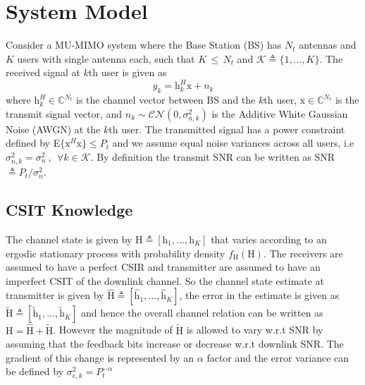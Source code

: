 \documentclass[journal]{IEEEtran}
\begin{document}
\section{System Model} \label{sys_mod}
Consider a MU-MIMO system where the Base Station (BS) has $N_t$ antennas and $K$ users with single antenna each, such that $K \, \leq \, N_t$ and $\mathcal{K} \triangleq \{1,..., K\}$. The received signal at $k$th user is given as
\begin{equation} 
 y_k  =  \bm{\mathrm{h}}^H_k \bm{\mathrm{x}} + n_k
\end{equation}
where $\bm{\mathrm{h}}^H_k \in \mathbb{C}^{N_t}$ is the channel vector between BS and the $k$th user, $\bm{\mathrm{x}} \in \mathbb{C}^{N_t}$ is the transmit signal vector, and $n_k \sim \mathcal{CN}(0,\sigma^2_{n,k})$ is the Additive White Gaussian Noise (AWGN) at the $k$th user. The transmitted signal has a power constraint defined by E$\{\bm{\mathrm{x}}^H\bm{\mathrm{x}}\}\leq P_t$ and we assume equal noise variances across all users, i.e $\sigma^2_{n,k} = \sigma^2_n\ ,\ \ \forall k \in \mathcal{K}$. By definition the transmit SNR can be written as SNR $\triangleq P_t/\sigma^2_n$.

\subsection{CSIT Knowledge}
The channel state is given by $\bm{\mathrm{H}} \triangleq [\bm{\mathrm{h}}_1,...,\bm{\mathrm{h}}_K]$ that varies according to an ergodic stationary process with probability density $f_\mathrm{H}(\bm{\mathrm{H}})$. The receivers are assumed to have a perfect CSIR and transmitter are assumed to have an imperfect CSIT of the downlink channel. So the channel state estimate at transmitter is given by $\widehat{\bm{\mathrm{H}}} \triangleq [\widehat{\bm{\mathrm{h}}}_1,...,\widehat{\bm{\mathrm{h}}}_K]$, the error in the estimate is given as $\widetilde{\bm{\mathrm{H}}} \triangleq [\widetilde{\bm{\mathrm{h}}}_1,...,\widetilde{\bm{\mathrm{h}}}_K]$ and hence the overall channel relation can be written as $\bm{\mathrm{H}} = \widehat{\bm{\mathrm{H}}}+\widetilde{\bm{\mathrm{H}}}$. However the magnitude of $\widetilde{\bm{\mathrm{H}}}$ is allowed to vary w.r.t SNR by assuming that the feedback bits increase or decrease w.r.t downlink SNR. The gradient of this change is represented by an $\alpha$ factor and the error variance can be defined by $\sigma^2_{e,k} = P^{-\alpha}_t$
\end{document}

